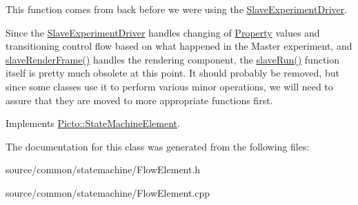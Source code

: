 This function comes from back before we were using the \hyperlink{class_picto_1_1_slave_experiment_driver}{Slave\-Experiment\-Driver}. 

Since the \hyperlink{class_picto_1_1_slave_experiment_driver}{Slave\-Experiment\-Driver} handles changing of \hyperlink{class_picto_1_1_property}{Property} values and transitioning control flow based on what happened in the Master experiment, and \hyperlink{class_picto_1_1_state_machine_element_ab993f13815701b3dc47a7f50985d29bf}{slave\-Render\-Frame()} handles the rendering component, the \hyperlink{class_picto_1_1_flow_element_a305d68e8cefb00cbb1f0d7f1c9026fc4}{slave\-Run()} function itself is pretty much obsolete at this point. It should probably be removed, but since some classes use it to perform various minor operations, we will need to assure that they are moved to more appropriate functions first. 

Implements \hyperlink{class_picto_1_1_state_machine_element_a0dbfefa77a60c323a285626bf6057c2b}{Picto\-::\-State\-Machine\-Element}.



The documentation for this class was generated from the following files\-:\begin{DoxyCompactItemize}
\item 
source/common/statemachine/Flow\-Element.\-h\item 
source/common/statemachine/Flow\-Element.\-cpp\end{DoxyCompactItemize}
